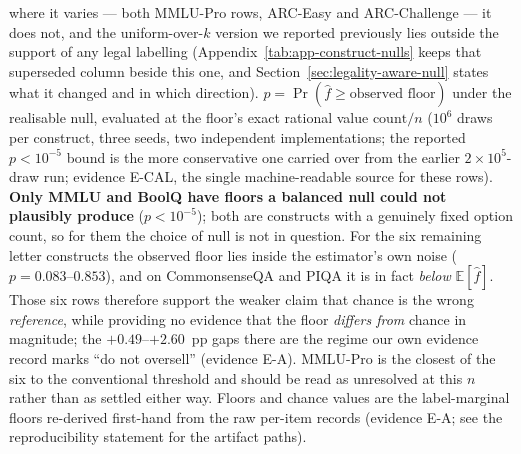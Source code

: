 \begin{table}[t]
{where it varies --- both MMLU-Pro rows, ARC-Easy and ARC-Challenge --- it does not, and the
uniform-over-$k$ version we reported previously lies outside the support of any legal labelling
(Appendix~\ref{tab:app-construct-nulls} keeps that superseded column beside this one, and
Section~\ref{sec:legality-aware-null} states what it changed and in which direction).
$p=\Pr(\hat f\ge\text{observed floor})$ under the realisable null, evaluated at the floor's exact
rational value $\text{count}/n$ ($10^{6}$ draws per construct, three seeds, two independent
implementations; the reported $p<10^{-5}$ bound is the more conservative one carried over from the
earlier $2\times10^{5}$-draw run; evidence \textsf{E-CAL}, the single machine-readable source for
these rows). \textbf{Only MMLU and BoolQ have floors a balanced null could not plausibly produce}
($p<10^{-5}$); both are constructs with a genuinely fixed option count, so for them the choice of
null is not in question. For the six remaining letter constructs the observed floor lies inside the
estimator's own noise ($p=0.083$--$0.853$), and on CommonsenseQA and PIQA it is in fact
\emph{below} $\mathbb{E}[\hat f]$. Those six rows therefore support the weaker claim that chance is
the wrong \emph{reference}, while providing no evidence that the floor \emph{differs from} chance in
magnitude; the $+0.49$--$+2.60$~pp gaps there are the regime our own evidence record marks ``do not
oversell'' (evidence \textsf{E-A}). MMLU-Pro is the closest of the six to the conventional
threshold and should be read as unresolved at this $n$ rather than as settled either way. Floors and
chance values are the label-marginal floors re-derived first-hand from the raw per-item records
(evidence \textsf{E-A}; see the reproducibility statement for the artifact paths).}
\label{tab:nulls}
\end{table}

